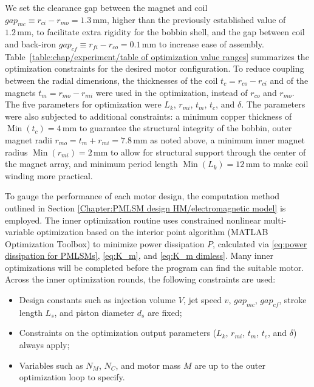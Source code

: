     
    We set the clearance gap between the magnet and coil $gap_{mc}\equiv r_{ci}-r_{mo} = 1.3\,\mathrm{mm}$, higher than the previously established value of $1.2\,\mathrm{mm}$,  to facilitate extra rigidity for the bobbin shell, and the gap between coil and back-iron $gap_{cf}\equiv r_{fi}-r_{co} = 0.1\,\mathrm{mm}$ to increase ease of assembly. Table~\ref{table:chap/experiment/table of optimization value ranges} summarizes the optimization constraints for the desired motor configuration. To reduce coupling between the radial dimensions, the thicknesses of the coil $t_c = r_{co} - r_{ci}$ and of the magnets $t_m = r_{mo} - r_{mi}$ were used in the optimization, instead of $r_{co}$ and $r_{mo}$. The five parameters for optimization were $L_k$, $r_{mi}$, $t_m$, $t_c$, and $\delta$. The parameters were also subjected to additional constraints: a minimum copper thickness of $\operatorname{Min}(t_c) = 4\,\mathrm{mm}$ to guarantee the structural integrity of the bobbin, outer magnet radii $r_{mo} = t_m + r_{mi} = 7.8\,\mathrm{mm}$ as noted above, a minimum inner magnet radius $\operatorname{Min}(r_{mi} ) = 2\,\mathrm{mm}$ to allow for structural support through the center of the magnet array, and minimum period length $\operatorname{Min}(L_k) = 12\,\mathrm{mm}$ to make coil winding more practical. 
    
    
    To gauge the performance of each motor design, the computation method outlined in Section \ref{Chapter:PMLSM design HM/electromagnetic model} is employed. The inner optimization routine uses constrained nonlinear multi-variable optimization based on the interior point algorithm (MATLAB Optimization Toolbox) to minimize power dissipation $P$, calculated via \eqref{eq:power dissipation for PMLSMs}, \eqref{eq:K_m}, and \eqref{eq:K_m dimless}. Many inner optimizations will be completed before the program can find the suitable motor. Across the inner optimization rounds, the following constraints are used: 
    
    
    \begin{itemize}
    \item Design constants such as injection volume $V$, jet speed $v$, $gap_{mc}$, $gap_{cf}$, stroke length $L_s$, and piston diameter $d_s$ are fixed;
    \item Constraints on the optimization output parameters ($L_k$, $r_{mi}$, $t_m$, $t_c$, and $\delta$) always apply;
    \item Variables such as $N_M$, $N_C$, and motor mass $M$ are up to the outer optimization loop to specify.
    \end{itemize}
    
